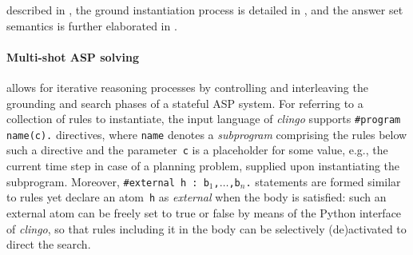 \documentclass{tlp} %
\newcommand{\clingo}{\emph{clingo}\xspace}
\begin{document}
described in \citep{cafageiakakrlemarisc20a,gehakalisc15a},
the ground instantiation process is detailed in \citep{kamsch21a},
and the answer set semantics is further elaborated in \citep{gehakalisc15a,lifschitz19a}.
%

\paragraph{Multi-shot ASP solving} \citep{gekakasc17a}
allows for iterative reasoning processes by controlling and interleaving
the grounding and search phases of a stateful ASP system.
For referring to a collection of rules to instantiate,
the input language of \clingo supports \lstinline{#program name(c).}
directives, where \lstinline{name} denotes a \emph{subprogram} comprising
the rules below such a directive and the parameter~\lstinline{c} is a
placeholder for some value, e.g., the current time step in case of a
planning problem, supplied upon instantiating the subprogram.
Moreover, \lstinline{#external h : b}$_1$\lstinline{,}$\dots$\lstinline{,b}$_n$\lstinline{.}
statements are formed similar to rules yet declare an atom~\lstinline{h} as
\emph{external} when the body is satisfied:
such an external atom can be freely set to true or false by means of the
Python interface of \clingo,
so that rules including it in the body can be selectively (de)activated
to direct the search.
%
\end{document}
